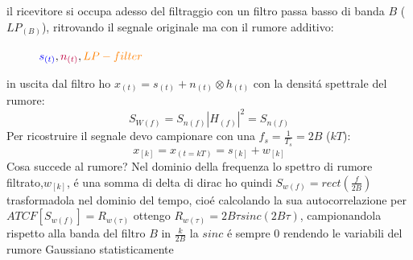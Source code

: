             il ricevitore si occupa adesso del filtraggio con un filtro passa basso di banda $B$ ($LP_{(B)}$), ritrovando il 
            segnale originale ma con il rumore additivo:
            \begin{figure}[H]
                \centering
                \caption{${\color{blue}s_{(t)}},{\color{purple}n_{(t)}},{\color{orange}LP-filter}$}
            \end{figure}
            in uscita dal filtro ho $x_{(t)} = s_{(t)} + n_{(t)} \otimes h_{(t)}$ con la densitá spettrale del rumore:
            \[
                S_{W(f)} = S_{n(f)} |H_{(f)}|^2 = S_{n(f)} 
            \]
            Per ricostruire il segnale devo campionare con una $f_s = \frac{1}{T_s} = 2B$ ($kT$):
            \[
                x_{[k]} = x_{(t=kT)} = s_{[k]}+w_{[k]}    
            \]
            Cosa succede al rumore?
            Nel dominio della frequenza lo spettro di rumore filtrato,$w_{[k]}$, é  una somma di delta di dirac ho quindi $S_{w(f)} = rect\left(\frac{f}{2B}\right)$
            trasformadola nel dominio del tempo, cioé calcolando la sua autocorrelazione per $ATCF[S_{w(f)}] = R_{w(\tau)}$ ottengo $R_{w(\tau)} = 2B\tau sinc(2B\tau)$,
            campionandola rispetto alla banda del filtro $B$ in $\frac{k}{2B}$ la $sinc$ é sempre $0$ rendendo le variabili del rumore Gaussiano statisticamente 
